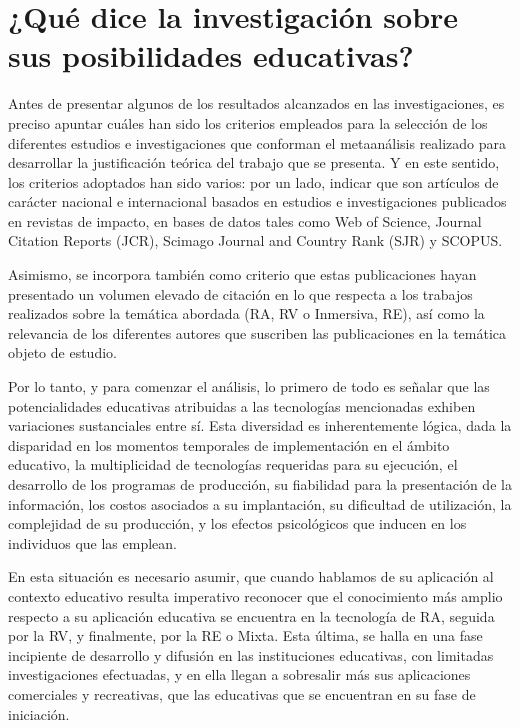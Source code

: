 \documentclass[spanish]{textolivre}
\begin{document}
\section{¿Qué dice la investigación sobre sus posibilidades educativas?}\label{sec-normas}
Antes de presentar algunos de los resultados alcanzados en las investigaciones, es preciso apuntar cuáles han sido los criterios empleados para la selección de los diferentes estudios e investigaciones que conforman el metaanálisis realizado para desarrollar la justificación teórica del trabajo que se presenta. Y en este sentido, los criterios adoptados han sido varios: por un lado, indicar que son artículos de carácter nacional e internacional basados en estudios e investigaciones publicados en revistas de impacto, en bases de datos tales como Web of Science, Journal Citation Reports (JCR), Scimago Journal and Country Rank (SJR) y SCOPUS. 

Asimismo, se incorpora también como criterio que estas publicaciones hayan presentado un volumen elevado de citación en lo que respecta a los trabajos realizados sobre la temática abordada (RA, RV o Inmersiva, RE), así como la relevancia de los diferentes autores que suscriben las publicaciones en la temática objeto de estudio. 

Por lo tanto, y para comenzar el análisis, lo primero de todo es señalar que las potencialidades educativas atribuidas a las tecnologías mencionadas exhiben variaciones sustanciales entre sí. Esta diversidad es inherentemente lógica, dada la disparidad en los momentos temporales de implementación en el ámbito educativo, la multiplicidad de tecnologías requeridas para su ejecución, el desarrollo de los programas de producción, su fiabilidad para la presentación de la información, los costos asociados a su implantación, su dificultad de utilización, la complejidad de su producción, y los efectos psicológicos que inducen en los individuos que las emplean.

En esta situación es necesario asumir, que cuando hablamos de su aplicación al contexto educativo resulta imperativo reconocer que el conocimiento más amplio respecto a su aplicación educativa se encuentra en la tecnología de RA, seguida por la RV, y finalmente, por la RE o Mixta. Esta última, se halla en una fase incipiente de desarrollo y difusión en las instituciones educativas, con limitadas investigaciones efectuadas, y en ella llegan a sobresalir más sus aplicaciones comerciales y recreativas, que las educativas que se encuentran en su fase de iniciación.
\end{document}
